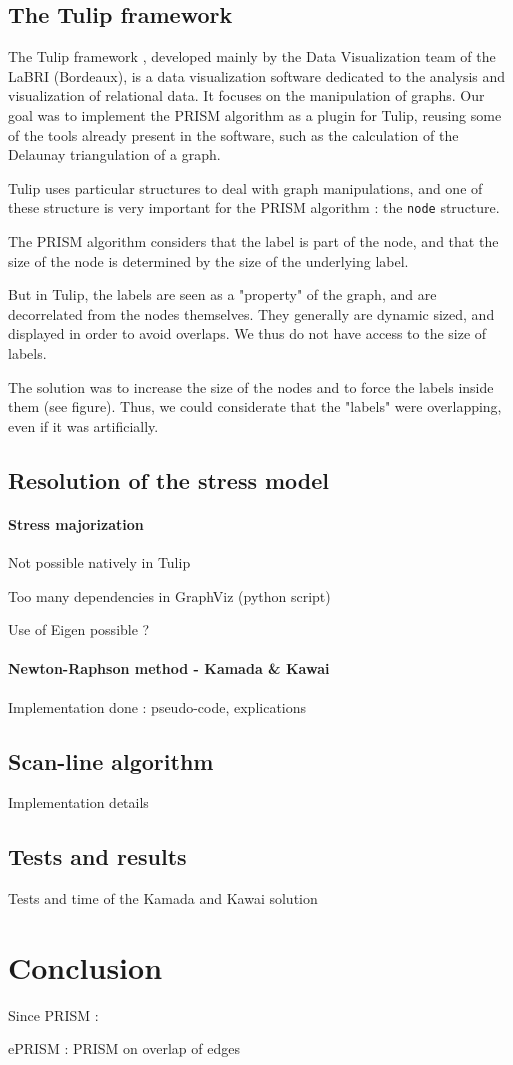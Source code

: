 \documentclass[12pt]{report}
\begin{document}
\section{The Tulip framework}

The Tulip framework \cite{Auber12}, developed mainly by the Data Visualization team of the LaBRI (Bordeaux), is a data visualization software dedicated to the analysis and visualization of relational data. It focuses on the manipulation of graphs. Our goal was to implement the PRISM algorithm as a plugin for Tulip, reusing some of the tools already present in the software, such as the calculation of the Delaunay triangulation of a graph.

Tulip uses particular structures to deal with graph manipulations, and one of these structure is very important for the PRISM algorithm : the \texttt{node} structure.

The PRISM algorithm considers that the label is part of the node, and that the size of the node is determined by the size of the underlying label.

But in Tulip, the labels are seen as a "property" of the graph, and are decorrelated from the nodes themselves. They generally are dynamic sized, and displayed in order to avoid overlaps. We thus do not have access to the size of labels.

The solution was to increase the size of the nodes and to force the labels inside them (see figure). Thus, we could considerate that the "labels" were overlapping, even if it was artificially.

\section{Resolution of the stress model}
\subsubsection{Stress majorization}
Not possible natively in Tulip

Too many dependencies in GraphViz (python script)

Use of Eigen possible ?
\subsubsection{Newton-Raphson method - Kamada \& Kawai}
Implementation done : pseudo-code, explications

\section{Scan-line algorithm}
Implementation details

\section{Tests and results}
Tests and time of the Kamada and Kawai solution

\chapter{Conclusion}

Since PRISM :

ePRISM : PRISM on overlap of edges \cite{Hu09}



\end{document}
